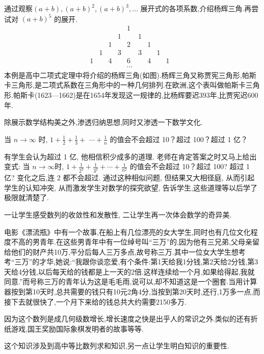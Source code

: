 \begin{example}[杨辉三角]
	通过观察$(a+b),(a+b)^2,(a+b)^3,\ldots$ 展开式的各项系数,介绍杨辉三角.再尝试对 $(a+b)^5$ 的展开.
	\begin{equation*}
		\begin{array}{cccccccccc}
			  &   &   &   & 1      &   &   &   &   & \\
			  &   &   & 1 &        & 1 &   &   &   & \\
			  &   & 1 &   & 2      &   & 1 &   &   & \\
			  & 1 &   & 3 &        & 3 &   & 1 &   & \\
			1 &   & 4 &   & 6      &   & 4 &   & 1 & \\
			  &   &   &   & \cdots &   &   &   &   &
		\end{array}
	\end{equation*}
	本例是高中二项式定理中将介绍的杨辉三角(如图).杨辉三角又称贾宪三角形,帕斯卡三角形,是二项式系数在三角形中的一种几何排列.在欧洲,这个表叫做帕斯卡三角形.帕斯卡(1623—1662)是在1654年发现这一规律的,比杨辉要迟393年,比贾宪迟600年.
\end{example}
\begin{purpose}
	除展示数学结构美之外,渗透归纳思想,同时又渗透一下数学文化.
\end{purpose}

\begin{example}[极限雏形]
	当 $n \rightarrow \infty$ 时, $1+\frac{1}{2}+\frac{1}{3}+$ $\cdots+\frac{1}{n}$ 的值会不会超过 10？超过 100？超过 1 亿？

	有学生会认为超过 1 亿, 他相信积少成多的道理. 老师在肯定答案之时又马上给出变式: 当 $n \rightarrow \infty$时, $1+\frac{1}{2^2}+\frac{1}{3^2}+\cdots+\frac{1}{n^2}$ 的值会不会超过 10？超过 100? 超过 1 亿? 变化之后,连 2 都不会超过. 通过这种相似问题, 但结果又大相径庭, 从而引起学生的认知冲突, 从而激发学生对数学的探究欲望, 告诉学生,这些道理等以后学了极限就清楚了.
\end{example}
\begin{purpose}
	一让学生感受数列的收敛性和发散性, 二让学生再一次体会数学的奇异美.
\end{purpose}

\begin{example}[几何级数]
	电影《漂流瓶》中有一个故事,在船上有几位漂亮的女大学生,同时也有几位文化程度不高的男青年.在这些男青年中有一位绰号叫“三万”的,因为他有三兄弟,父母亲留给他们的财产共10万,平分后每人三万多点,故号称三万.其中一位女大学生想考考“三万”的才华,她说:“我跟你谈恋爱,有个条件:第1天给我1分钱,第2天给2分钱,第3天给4分钱,以后每天给的钱都是上一天的2倍.这样连续给一个月,如果给得起,我就同意.”而号称三万的青年认为这是毛毛雨,说可以,却不知道这是一个圈套.当用计算器按到第10天时,总共需要的钱只有10元2角4分,当按到第20天时,还行,1万多一点,而接下去就很快了,一个月下来给的钱总共大约需要2150多万.

	因为这个数列是成几何级数增长,增长速度之快是出乎人的常识之外.类似的还有折纸游戏,国王奖励国际象棋发明者的故事等等.
\end{example}
\begin{purpose}
	这个知识涉及到高中等比数列求和知识,另一点让学生明白知识的重要性.
\end{purpose}

